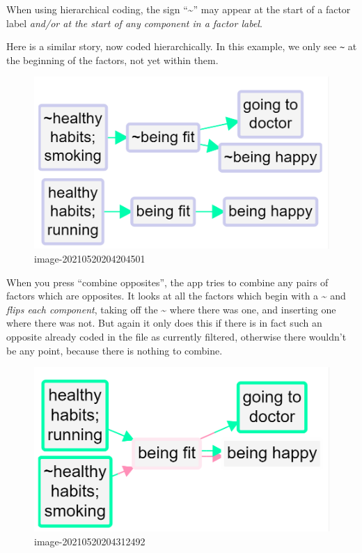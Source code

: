 \documentclass[
]{book}
\begin{document}
When using hierarchical coding, the sign ``\textasciitilde{}'' may appear at the start of a factor label \emph{and/or at the start of any component in a factor label}.

Here is a similar story, now coded hierarchically. In this example, we only see \texttt{\textasciitilde{}} at the beginning of the factors, not yet within them.

\begin{figure}
\centering
\includegraphics{_assets/image-20210520204204501.png}
\caption{image-20210520204204501}
\end{figure}

When you press ``combine opposites'', the app tries to combine any pairs of factors which are opposites. It looks at all the factors which begin with a \textasciitilde{} and \emph{flips each component}, taking off the \textasciitilde{} where there was one, and inserting one where there was not. But again it only does this if there is in fact such an opposite already coded in the file as currently filtered, otherwise there wouldn't be any point, because there is nothing to combine.

\begin{figure}
\centering
\includegraphics{_assets/image-20210520204312492.png}
\caption{image-20210520204312492}
\end{figure}
\end{document}
